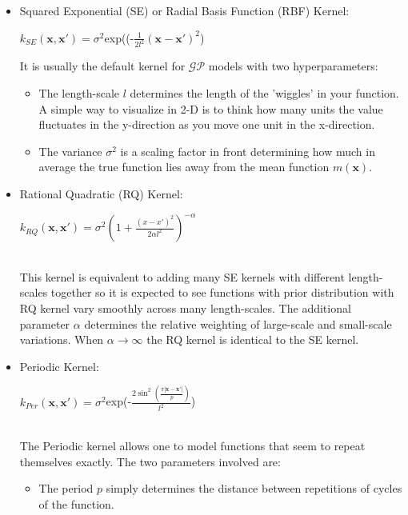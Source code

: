 \documentclass{article}
\begin{document}
\begin{itemize}
    \item Squared Exponential (SE) or Radial Basis Function (RBF) Kernel:\vspace{5mm}
    
    \centerline{$k_{SE}(\mathbf{x},\mathbf{x'}) = \sigma^2$exp((-$\frac{1}{2l^2}(\mathbf{x}-\mathbf{x'})^2$)}\vspace{5mm}
    
    It is usually the default kernel for $\mathcal{GP}$ models with two hyperparameters:
    \begin{itemize}
        \item The length-scale $l$ determines the length of the 'wiggles' in your function. A simple way to visualize in  2-D is to think how many units the value fluctuates in the y-direction as you move one unit in the x-direction.
        \item The variance $\sigma^2$ is a scaling factor in front determining how much in average the true function lies away from the mean function $m(\mathbf{x})$. 
    \end{itemize}
    \item Rational Quadratic (RQ) Kernel: \vspace{5mm}\\
    \centerline{$k_{RQ}(\mathbf{x},\mathbf{x'}) = \sigma^2(1+\frac{(x-x')^2}{2\alpha l^2})^{-\alpha}$}\vspace{5mm}\\
    This kernel is equivalent to adding many SE kernels with different length-scales together so it is expected to see functions with prior distribution with RQ kernel vary smoothly across many length-scales. The additional parameter $\alpha$ determines the relative weighting of large-scale and small-scale variations. When $\alpha \to \infty$ the RQ kernel is identical to the SE kernel.\\
    \item Periodic Kernel: \vspace{5mm}\\
    \centerline{$k_{Per}(\mathbf{x}, \mathbf{x'}) = \sigma^2$exp(-$\frac{2\sin ^2(\frac{\pi|\mathbf{x}-\mathbf{x'}|}{p})}{l^2}$)} \vspace{5mm}\\
    The Periodic kernel allows one to model functions that seem to repeat themselves exactly. The two parameters involved are:
    \begin{itemize}
        \item The period $p$ simply determines the distance between repetitions of cycles of the function.

\end{itemize}
\end{itemize}
\end{document}
